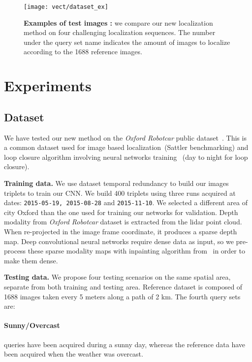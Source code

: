 \begin{figure}
	\center
	\texttt{[image: vect/dataset\_ex]}
	\caption{\label{fig:dataset} \textbf{Examples of test images :} we compare our new localization method on four challenging localization sequences. The number under the query set name indicates the amount of images to localize according to the 1688 reference images.}
\end{figure}

\section{Experiments}
\label{sec:experiments}

\subsection{Dataset}
\label{subsec:dataset}
	We have tested our new method on the \textit{Oxford Robotcar} public dataset~\cite{Maddern2016}. This is a common dataset used for image based localization~\cite{}(Sattler benchmarking) and loop closure algorithm involving neural networks training~\cite{} (day to night for loop closure).
		
\vspace{4pt}\noindent\textbf{Training data.}
	We use dataset temporal redundancy to build our images triplets to train our CNN. We build 400 triplets using three runs acquired at dates: \texttt{2015-05-19, 2015-08-28} and \texttt{2015-11-10}. We selected a different area of city Oxford than the one used for training our networks for validation.
	Depth modality from \textit{Oxford Robotcar} dataset is extracted from the lidar point cloud. When re-projected in the image frame coordinate, it produces a sparse depth map. Deep convolutional neural networks require dense data as input, so we pre-process these sparse modality maps with inpainting algorithm from~\cite{Bevilacqua2017} in order to make them dense.

\vspace{4pt}\noindent\textbf{Testing data.} We propose four testing scenarios on the same spatial area, separate from both training and testing area. Reference dataset is composed of 1688 images taken every 5 meters along a path of 2 km. The fourth query sets are:
	\paragraph{Sunny/Overcast} queries have been acquired during a sunny day, whereas the reference data have been acquired when the weather was overcast.
